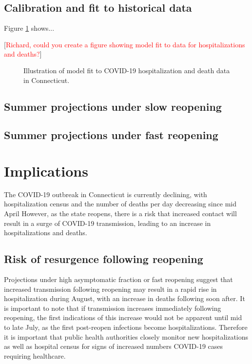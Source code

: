 \documentclass[11pt]{article}
\newcommand{\comment}[1]{[\textcolor{red}{#1}]}
\begin{document}
\subsection*{Calibration and fit to historical data}


Figure \ref{fig:calibration} shows...

\comment{Richard, could you create a figure showing model fit to data for hospitalizations and deaths?}


\begin{figure}
\centering
\caption{Illustration of model fit to COVID-19 hospitalization and death data in Connecticut. }
\label{fig:calibration}
\end{figure}


\subsection*{Summer projections under slow reopening} 




\subsection*{Summer projections under fast reopening} 






\section*{Implications}

The COVID-19 outbreak in Connecticut is currently declining, with hospitalization census and the number of deaths per day decreasing since mid April  However, as the state reopens, there is a risk that increased contact will result in a surge of COVID-19 transmission, leading to an increase in hospitalizations and deaths. 


\subsection*{Risk of resurgence following reopening} 

Projections under high asymptomatic fraction or fast reopening suggest that increased transmission following reopening may result in a rapid rise in hospitalization during August, with an increase in deaths following soon after.  It is important to note that if transmission increases immediately following reopening, the first indications of this increase would not be apparent until mid to late July, as the first post-reopen infections become hospitalizations.  Therefore it is important that public health authorities closely monitor new hospitalizations as well as hospital census for signs of increased numbers COVID-19 cases requiring healthcare.  
\end{document}
